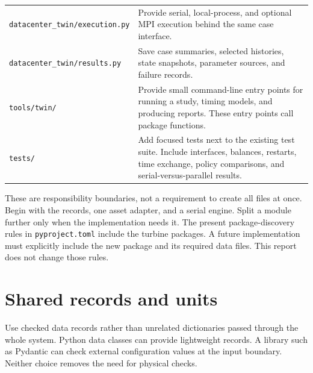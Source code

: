 \documentclass[11pt,a4paper]{report}
\newcommand{\sourcefile}[1]{\nolinkurl{#1}}
\begin{document}
\begin{longtable}{L{0.28\textwidth}L{0.60\textwidth}}
\sourcefile{datacenter_twin/execution.py} & Provide serial, local-process, and optional MPI execution behind the same case interface. \\
\sourcefile{datacenter_twin/results.py} & Save case summaries, selected histories, state snapshots, parameter sources, and failure records. \\
\sourcefile{tools/twin/} & Provide small command-line entry points for running a study, timing models, and producing reports. These entry points call package functions. \\
\sourcefile{tests/} & Add focused tests next to the existing test suite. Include interfaces, balances, restarts, time exchange, policy comparisons, and serial-versus-parallel results. \\
\bottomrule
\end{longtable}

These are responsibility boundaries, not a requirement to create all files at once.
Begin with the records, one asset adapter, and a serial engine.
Split a module further only when the implementation needs it.
The present package-discovery rules in \sourcefile{pyproject.toml} include the turbine packages.
A future implementation must explicitly include the new package and its required data files.
This report does not change those rules.

\section{Shared records and units}
Use checked data records rather than unrelated dictionaries passed through the whole system.
Python data classes can provide lightweight records.
A library such as Pydantic can check external configuration values at the input boundary.
Neither choice removes the need for physical checks.
\end{document}
